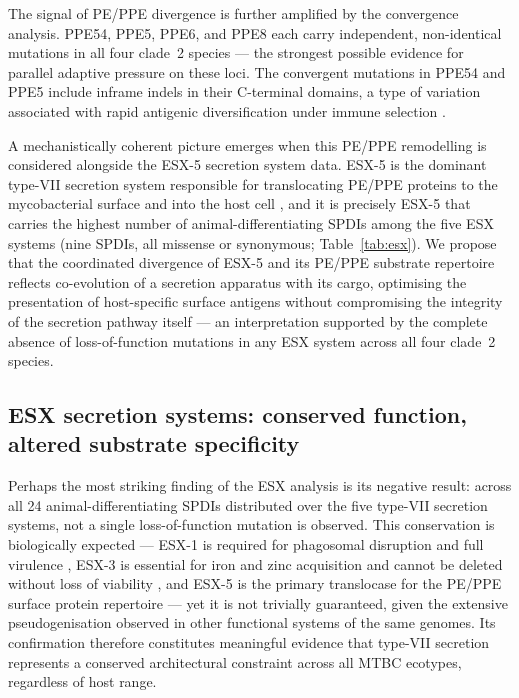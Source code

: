 \documentclass[11pt,a4paper]{article}
\begin{document}
The signal of PE/PPE divergence is further amplified by the convergence analysis.
%
PPE54, PPE5, PPE6, and PPE8 each carry independent, non-identical mutations in all
four clade~2 species --- the strongest possible evidence for parallel adaptive
pressure on these loci.
%
The convergent mutations in PPE54 and PPE5 include inframe indels in their
C-terminal domains, a type of variation associated with rapid antigenic
diversification under immune selection \cite{Fishbain2015}.

A mechanistically coherent picture emerges when this PE/PPE remodelling is
considered alongside the ESX-5 secretion system data.
%
ESX-5 is the dominant type-VII secretion system responsible for translocating
PE/PPE proteins to the mycobacterial surface and into the host cell
\cite{Houben2012}, and it is precisely ESX-5 that carries the highest number
of animal-differentiating SPDIs among the five ESX systems (nine SPDIs, all missense
or synonymous; Table~\ref{tab:esx}).
%
We propose that the coordinated divergence of ESX-5 and its PE/PPE substrate
repertoire reflects co-evolution of a secretion apparatus with its cargo,
optimising the presentation of host-specific surface antigens without
compromising the integrity of the secretion pathway itself --- an interpretation
supported by the complete absence of loss-of-function mutations in any ESX system
across all four clade~2 species.

\subsection{ESX secretion systems: conserved function, altered substrate specificity}
\label{sec:disc:esx}

Perhaps the most striking finding of the ESX analysis is its negative result: across
all 24 animal-differentiating SPDIs distributed over the five type-VII secretion systems,
not a single loss-of-function mutation is observed.
%
This conservation is biologically expected --- ESX-1 is required for phagosomal
disruption and full virulence \cite{Hsu2003, Derbyshire2012}, ESX-3 is essential
for iron and zinc acquisition and cannot be deleted without loss of viability
\cite{Serafini2009, Siegrist2009}, and ESX-5 is the primary translocase for the
PE/PPE surface protein repertoire \cite{Houben2012} --- yet it is not trivially
guaranteed, given the extensive pseudogenisation observed in other functional
systems of the same genomes.
%
Its confirmation therefore constitutes meaningful evidence that type-VII secretion
represents a conserved architectural constraint across all MTBC ecotypes,
regardless of host range.
\end{document}
